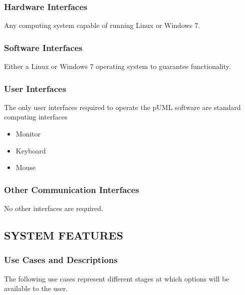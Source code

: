 \documentclass[twoside,letterpaper]{article}
\begin{document}
\subsubsection[Hardware Interfaces]{\bfseries
Hardware Interfaces}
{

{
Any computing system capable of running Linux or Windows 7.}}

\subsubsection[Software Interfaces]{\bfseries
Software Interfaces}
{ 
{
Either a Linux or Windows 7 operating system to guarantee functionality.
}}

\subsubsection[User Interfaces]{\bfseries
User Interfaces}
{
The only user interfaces required to operate the pUML software are standard computing interfaces
\begin{itemize}
  \item Monitor
  \item Keyboard
  \item Mouse
\end{itemize}
}

\subsubsection[Other Communication
Interfaces]{\bfseries
Other Communication Interfaces}
{
{No other interfaces are required. }}





\clearpage\setcounter{page}{1}\pagestyle{Convertv}

\subsection[SYSTEM FEATURES]{\bfseries
SYSTEM FEATURES}


\subsubsection{Use Cases and Descriptions}
{The following use cases represent different stages at which options will be available to the user.}

\bigskip

\end{document}
